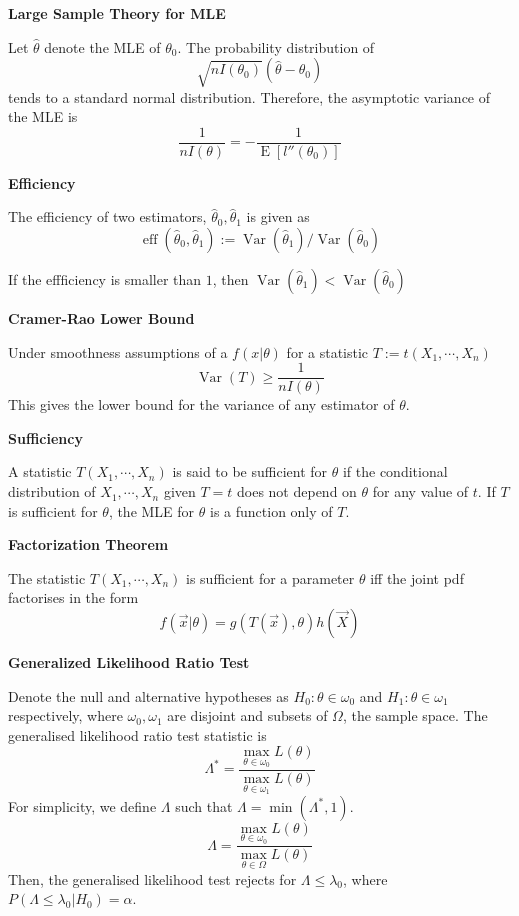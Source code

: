 \documentclass[a4paper]{article}
\newcommand{\subheading}[1]{{\scriptsize\textbf{#1}}}
\newcommand{\expectation}[1]{\operatorname{E}[#1]}
\DeclareMathOperator{\Var}{Var}
\DeclareMathOperator{\eff}{eff}
\begin{document}
\begin{multicols*}{4}
\subheading{Large Sample Theory for MLE}

  Let $\hat{\theta}$ denote the MLE of $\theta_0$. The probability distribution
  of
  $$\sqrt{nI(\theta_0)}(\hat{\theta} - \theta_0)$$
  tends to a standard normal distribution. Therefore, the asymptotic variance of
  the MLE is
  $$\frac{1}{nI(\theta)} = - \frac{1}{\expectation{l''(\theta_0)}}$$

\subheading{Efficiency}

  The efficiency of two estimators, $\hat{\theta}_0, \hat{\theta}_1$ is given as
  $$\eff(\hat{\theta}_0, \hat{\theta}_1) :=
    \Var(\hat{\theta}_1)/\Var(\hat{\theta}_0)$$
  
  If the effficiency is smaller than $1$, then $\Var(\hat{\theta}_1)< \Var(\hat{\theta}_0)$

\subheading{Cramer-Rao Lower Bound}

  Under smoothness assumptions of a $f(x|\theta)$ for a statistic $T:=t(X_1,
  \cdots, X_n)$
  $$\Var(T) \geq \frac{1}{nI(\theta)}$$
  This gives the lower bound for the variance of any estimator of $\theta$. \smallskip

\subheading{Sufficiency}

A statistic $T(X_1, \cdots, X_n)$ is said to be sufficient for $\theta$ if the
  conditional distribution of $X_1, \cdots, X_n$ given $T=t$ does not depend on
  $\theta$ for any value of $t$. If $T$ is sufficient for $\theta$, the MLE for
  $\theta$ is a function only of $T$.
  \smallskip

\subheading{Factorization Theorem}

  The statistic $T(X_1, \cdots, X_n)$ is sufficient for a parameter $\theta$ iff
  the joint pdf factorises in the form
  $$f(\vec{x}|\theta) = g(T(\vec{x}), \theta)h(\vec{X})$$

\subheading{Generalized Likelihood Ratio Test}

  Denote the null and
  alternative hypotheses as $H_0: \theta \in \omega_0$ and $H_1: \theta \in
  \omega_1$ respectively, where $\omega_0, \omega_1$ are disjoint and subsets of
  $\Omega$, the sample space. The generalised likelihood ratio test statistic is
  $$\Lambda^* = \frac{
    \max_{\theta \in \omega_0} L(\theta)
  }{
    \max_{\theta \in \omega_1} L(\theta)
  }$$
  For simplicity, we define $\Lambda$ such that $\Lambda = \min(\Lambda^*, 1)$.
  $$\Lambda = \frac{
    \max_{\theta \in \omega_0} L(\theta)
  }{
    \max_{\theta \in \Omega} L(\theta)
  }$$
  Then, the generalised likelihood test rejects for $\Lambda \leq \lambda_0$,
  where $P(\Lambda \leq \lambda_0 | H_0) = \alpha$.
\smallskip


\end{multicols*}
\end{document}
